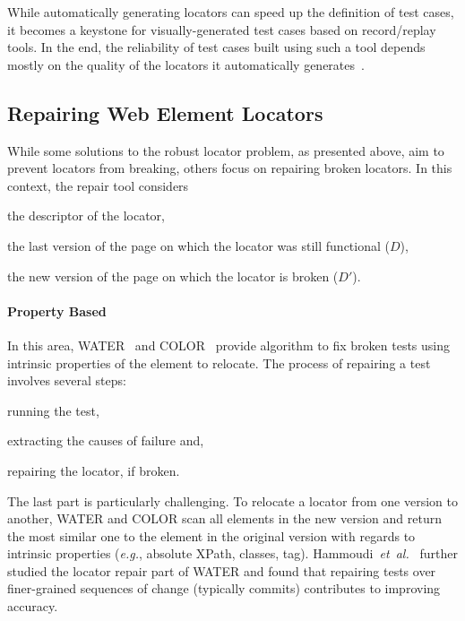 \documentclass[preprint, 12pt]{elsarticle}
\begin{document}
While automatically generating locators can speed up the
definition of test cases, it becomes a keystone for visually-generated test
cases based on record/replay tools. In the end, the reliability of test cases
built using such a tool depends mostly on the quality of the locators it
automatically generates~\cite{hammoudi2016record}.


\subsection{Repairing Web Element Locators}
While some solutions to the robust locator problem, as presented above, aim to prevent locators from breaking, others focus on repairing broken locators.
In this context, the repair tool considers
\begin{inparaenum}[\em a)]
    \item the descriptor of the locator,
    \item the last version of the page on which the locator was still functional ($D$),
    \item the new version of the page on which the locator is broken ($D'$).
\end{inparaenum}

\paragraph{Property Based}
In this area, WATER~\cite{choudhary2011water} and COLOR~\cite{kirinuki2019color}
provide algorithm to fix broken tests using intrinsic properties of the element
to relocate.
The process of repairing a test involves several steps: 
\begin{inparaenum}
\item running the test, 
\item extracting the causes of failure and,
\item repairing the locator, if broken. 
\end{inparaenum}
The last part is particularly challenging. 
To relocate a locator from one version to another, WATER and COLOR scan all elements in the new version and return the most similar one to the element in the original version with regards to intrinsic properties (\emph{e.g.}, absolute XPath, classes, tag).
Hammoudi~\emph{et~al.}~\cite{hammoudi2016waterfall} further studied the locator repair part of WATER and found that repairing tests over finer-grained sequences of change (typically commits) contributes to improving accuracy.
\end{document}
